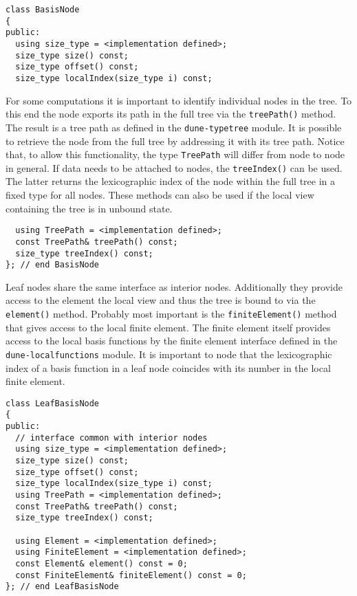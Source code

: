 \documentclass[a4paper,10pt,headings=normal,bibliography=totoc]{scrartcl}
\newcommand{\dunemodule}[1]{\texttt{#1}}
\begin{document}
\begin{lstlisting}
class BasisNode
{
public:
  using size_type = <implementation defined>;
  size_type size() const;
  size_type offset() const;
  size_type localIndex(size_type i) const;
\end{lstlisting}

For some computations it is important to identify
individual nodes in the tree. To this end the node
exports its path in the full tree via the \texttt{treePath()}
method. The result is a tree path
as defined in the \dunemodule{dune-typetree} module.
It is possible to retrieve the node from the full
tree by addressing it with its tree path.
Notice that, to allow this functionality, the
type \texttt{TreePath} will differ from node to node
in general. If data needs to be attached to nodes,
the \texttt{treeIndex()} can be used. The latter returns
the lexicographic index of the node within the full
tree in a fixed type for all nodes.
These methods can also be used if the local view containing
the tree is in unbound state.

\begin{lstlisting}
  using TreePath = <implementation defined>;
  const TreePath& treePath() const;
  size_type treeIndex() const;
}; // end BasisNode
\end{lstlisting}

Leaf nodes share the same interface as interior
nodes. Additionally they provide access to the
element the local view and thus the tree is bound
to via the \texttt{element()} method. Probably most important
is the \texttt{finiteElement()} method that gives access
to the local finite element. The finite element
itself provides access to the local basis functions
by the finite element interface defined in the
\dunemodule{dune-localfunctions} module.
It is important to node that the lexicographic
index of a basis function in a leaf node coincides
with its number in the local finite element.

\begin{lstlisting}
class LeafBasisNode
{
public:
  // interface common with interior nodes
  using size_type = <implementation defined>;
  size_type size() const;
  size_type offset() const;
  size_type localIndex(size_type i) const;
  using TreePath = <implementation defined>;
  const TreePath& treePath() const;
  size_type treeIndex() const;

  using Element = <implementation defined>;
  using FiniteElement = <implementation defined>;
  const Element& element() const = 0;
  const FiniteElement& finiteElement() const = 0;
}; // end LeafBasisNode
\end{lstlisting}
\end{document}
